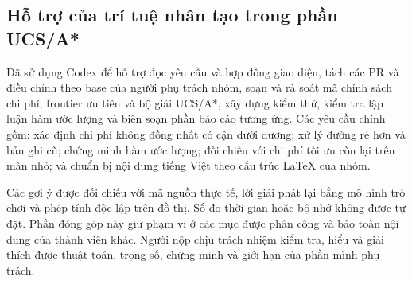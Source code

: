 \subsection{Hỗ trợ của trí tuệ nhân tạo trong phần UCS/A*}
Đã sử dụng Codex để hỗ trợ đọc yêu cầu và hợp đồng giao diện, tách các PR và điều chỉnh theo
base của người phụ trách nhóm, soạn và rà soát mã chính sách chi phí, frontier
ưu tiên và bộ giải UCS/A*, xây dựng kiểm thử, kiểm tra lập luận hàm ước lượng và biên soạn phần
báo cáo tương ứng. Các yêu cầu chính gồm: xác định chi phí không đồng nhất có
cận dưới dương; xử lý đường rẻ hơn và bản ghi cũ; chứng minh hàm ước lượng;
đối chiếu với chi phí tối ưu còn lại trên màn nhỏ; và chuẩn bị nội dung tiếng
Việt theo cấu trúc LaTeX của nhóm.

Các gợi ý được đối chiếu với mã nguồn thực tế, lời giải phát lại bằng mô hình
trò chơi và phép tính độc lập trên đồ thị. Số đo thời gian hoặc bộ nhớ không
được tự đặt. Phần đóng góp này giữ phạm vi ở các mục được phân công và bảo
toàn nội dung của thành viên khác. Người nộp chịu trách nhiệm kiểm tra,
hiểu và giải thích được thuật toán, trọng số, chứng minh và giới hạn của phần
mình phụ trách.

